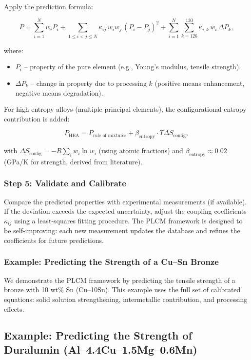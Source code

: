 \documentclass[12pt,a4paper]{article}
\begin{document}
	Apply the prediction formula:
	
	\[
	P = \sum_{i=1}^{N} w_i P_i
	+ \sum_{1\le i<j\le N} \kappa_{ij}\, w_i w_j\, (P_i - P_j)^2
	+ \sum_{i=1}^{N} \sum_{k=126}^{130} \kappa_{i,k}\, w_i\, \Delta P_k,
	\]
	
	where:
	\begin{itemize}
		\item \(P_i\) – property of the pure element (e.g., Young’s modulus, tensile strength).
		\item \(\Delta P_k\) – change in property due to processing \(k\) (positive means enhancement, negative means degradation).
	\end{itemize}
	
	For high‑entropy alloys (multiple principal elements), the configurational entropy contribution is added:
	
	\[
	P_{\text{HEA}} = P_{\text{rule of mixtures}} + \beta_{\text{entropy}} \cdot T \Delta S_{\text{config}},
	\]
	
	with \(\Delta S_{\text{config}} = -R \sum_i w_i \ln w_i\) (using atomic fractions) and \(\beta_{\text{entropy}} \approx 0.02\) (GPa/K for strength, derived from literature).
	
	\subsubsection{Step 5: Validate and Calibrate}
	
	Compare the predicted properties with experimental measurements (if available). If the deviation exceeds the expected uncertainty, adjust the coupling coefficients \(\kappa_{ij}\) using a least‑squares fitting procedure. The PLCM framework is designed to be self‑improving: each new measurement updates the database and refines the coefficients for future predictions.
	
	\subsubsection{Example: Predicting the Strength of a Cu–Sn Bronze}
	\label{subsec:example-bronze}
	
	We demonstrate the PLCM framework by predicting the tensile strength of a bronze with 10 wt\% Sn (Cu–10Sn). This example uses the full set of calibrated equations: solid solution strengthening, intermetallic contribution, and processing effects.
	
	\subsection{Example: Predicting the Strength of Duralumin (Al--4.4Cu--1.5Mg--0.6Mn)}
	\label{subsec:example-duralumin}
	
\end{document}
